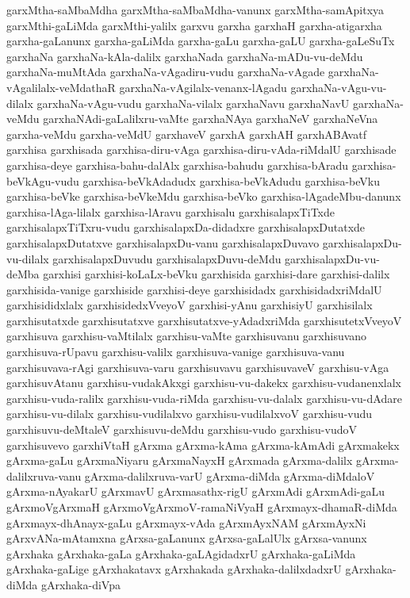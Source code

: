 {garxMtha-saMbaMdha
garxMtha-saMbaMdha-vanunx
garxMtha-samApitxya
garxMthi-gaLiMda
garxMthi-yalilx
garxvu
garxha
garxhaH
garxha-atigarxha
garxha-gaLanunx
garxha-gaLiMda
garxha-gaLu
garxha-gaLU
garxha-gaLeSuTx
garxhaNa
garxhaNa-kAla-dalilx
garxhaNada
garxhaNa-mADu-vu-deMdu
garxhaNa-muMtAda
garxhaNa-vAgadiru-vudu
garxhaNa-vAgade
garxhaNa-vAgalilalx-veMdathaR
garxhaNa-vAgilalx-venanx-lAgadu
garxhaNa-vAgu-vu-dilalx
garxhaNa-vAgu-vudu
garxhaNa-vilalx
garxhaNavu
garxhaNavU
garxhaNa-veMdu
garxhaNAdi-gaLalilxru-vaMte
garxhaNAya
garxhaNeV
garxhaNeVna
garxha-veMdu
garxha-veMdU
garxhaveV
garxhA
garxhAH
garxhABAvatf
garxhisa
garxhisada
garxhisa-diru-vAga
garxhisa-diru-vAda-riMdalU
garxhisade
garxhisa-deye
garxhisa-bahu-dalAlx
garxhisa-bahudu
garxhisa-bAradu
garxhisa-beVkAgu-vudu
garxhisa-beVkAdadudx
garxhisa-beVkAdudu
garxhisa-beVku
garxhisa-beVke
garxhisa-beVkeMdu
garxhisa-beVko
garxhisa-lAgadeMbu-danunx
garxhisa-lAga-lilalx
garxhisa-lAravu
garxhisalu
garxhisalapxTiTxde
garxhisalapxTiTxru-vudu
garxhisalapxDa-didadxre
garxhisalapxDutatxde
garxhisalapxDutatxve
garxhisalapxDu-vanu
garxhisalapxDuvavo
garxhisalapxDu-vu-dilalx
garxhisalapxDuvudu
garxhisalapxDuvu-deMdu
garxhisalapxDu-vu-deMba
garxhisi
garxhisi-koLaLx-beVku
garxhisida
garxhisi-dare
garxhisi-dalilx
garxhisida-vanige
garxhiside
garxhisi-deye
garxhisidadx
garxhisidadxriMdalU
garxhisididxlalx
garxhisidedxVveyoV
garxhisi-yAnu
garxhisiyU
garxhisilalx
garxhisutatxde
garxhisutatxve
garxhisutatxve-yAdadxriMda
garxhisutetxVveyoV
garxhisuva
garxhisu-vaMtilalx
garxhisu-vaMte
garxhisuvanu
garxhisuvano
garxhisuva-rUpavu
garxhisu-valilx
garxhisuva-vanige
garxhisuva-vanu
garxhisuvava-rAgi
garxhisuva-varu
garxhisuvavu
garxhisuvaveV
garxhisu-vAga
garxhisuvAtanu
garxhisu-vudakAkxgi
garxhisu-vu-dakekx
garxhisu-vudanenxlalx
garxhisu-vuda-ralilx
garxhisu-vuda-riMda
garxhisu-vu-dalalx
garxhisu-vu-dAdare
garxhisu-vu-dilalx
garxhisu-vudilalxvo
garxhisu-vudilalxvoV
garxhisu-vudu
garxhisuvu-deMtaleV
garxhisuvu-deMdu
garxhisu-vudo
garxhisu-vudoV
garxhisuvevo
garxhiVtaH
gArxma
gArxma-kAma
gArxma-kAmAdi
gArxmakekx
gArxma-gaLu
gArxmaNiyaru
gArxmaNayxH
gArxmada
gArxma-dalilx
gArxma-dalilxruva-vanu
gArxma-dalilxruva-varU
gArxma-diMda
gArxma-diMdaloV
gArxma-nAyakarU
gArxmavU
gArxmasathx-rigU
gArxmAdi
gArxmAdi-gaLu
gArxmoVgArxmaH
gArxmoVgArxmoV-ramaNiVyaH
gArxmayx-dhamaR-diMda
gArxmayx-dhAnayx-gaLu
gArxmayx-vAda
gArxmAyxNAM
gArxmAyxNi
gArxvANa-mAtamxna
gArxsa-gaLanunx
gArxsa-gaLalUlx
gArxsa-vanunx
gArxhaka
gArxhaka-gaLa
gArxhaka-gaLAgidadxrU
gArxhaka-gaLiMda
gArxhaka-gaLige
gArxhakatavx
gArxhakada
gArxhaka-dalilxdadxrU
gArxhaka-diMda
gArxhaka-diVpa
}
